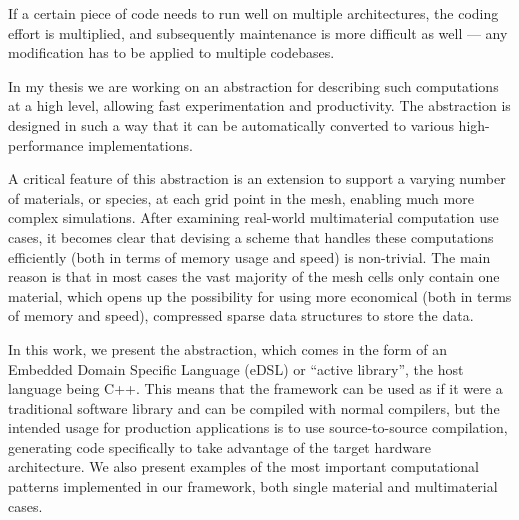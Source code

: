 \documentclass[fontsize=11pt, appendixprefix=true]{scrreprt}
\begin{document}
If a certain piece of code needs to run well on multiple architectures, the
coding effort is multiplied, and subsequently maintenance is more difficult as
well --- any modification has to be applied to multiple codebases.

In my thesis we are working on an abstraction for describing such computations
at a high level, allowing fast experimentation and productivity. The abstraction
is designed in such a way that it can be automatically converted to various
high-performance implementations.

A critical feature of this abstraction is an extension to support a varying
number of materials, or species, at each grid point in the mesh, enabling much
more complex simulations. After examining real-world multimaterial computation
use cases, it becomes clear that devising a scheme that handles these
computations efficiently (both in terms of memory usage and speed) is
non-trivial. The main reason is that in most cases the vast majority of the mesh
cells only contain one material, which opens up the possibility for using more
economical (both in terms of memory and speed), compressed sparse data
structures to store the data.

In this work, we present the abstraction, which comes in the form of an Embedded
Domain Specific Language (eDSL) or ``active library'', the host language being
C++. This means that the framework can be used as if it were a traditional
software library and can be compiled with normal compilers, but the intended
usage for production applications is to use source-to-source compilation,
generating code specifically to take advantage of the target hardware
architecture. We also present examples of the most important computational
patterns implemented in our framework, both single material and multimaterial
cases.

\newpage
\end{document}

